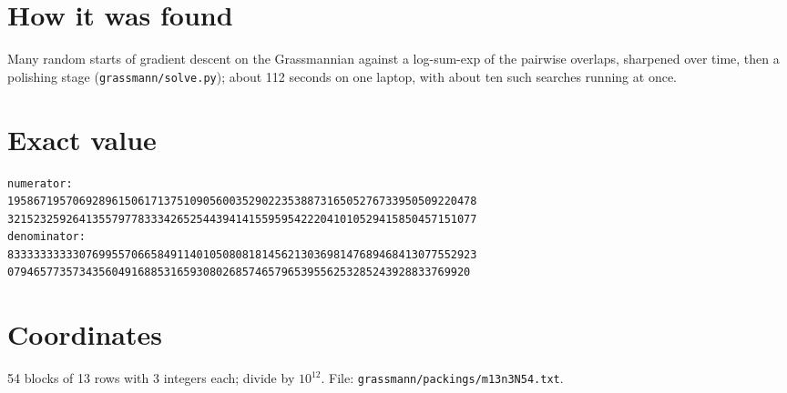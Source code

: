 \documentclass[11pt,a4paper]{article}
\begin{document}
\section{How it was found}
Many random starts of gradient descent on the Grassmannian against a log-sum-exp of the pairwise overlaps, sharpened over time, then a polishing stage (\texttt{grassmann/solve.py}); about 112 seconds on one laptop, with about ten such searches running at once.


\appendix
\section{Exact value}
{\small
\begin{verbatim}
numerator:
195867195706928961506171375109056003529022353887316505276733950509220478
321523259264135579778333426525443941415595954222041010529415850457151077
denominator:
833333333330769955706658491140105080818145621303698147689468413077552923
07946577357343560491688531659308026857465796539556253285243928833769920
\end{verbatim}}

\section{Coordinates}
54 blocks of 13 rows with 3 integers each; divide by $10^{12}$. File: \texttt{grassmann/packings/m13n3N54.txt}.
{\tiny
\begin{multicols}{3}
\end{multicols}}
\end{document}
